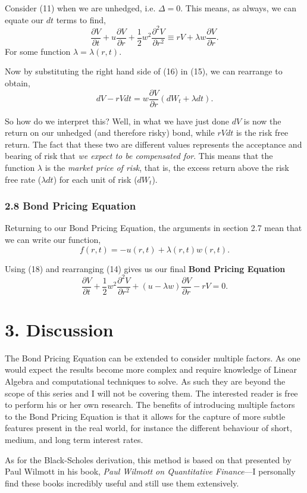 \documentclass[11pt]{article}
\begin{document}
Consider (11) when we are unhedged, i.e. $\Delta=0$. This means, as always, we can equate our $dt$ terms to find,
\begin{equation}
    \frac{\partial V}{\partial t} + u \frac{\partial V}{\partial r} + \frac{1}{2} w^2 \frac{\partial^2 V}{\partial r^2} \equiv rV + \lambda w \frac{\partial V}{\partial r}.
\end{equation}
For some function $\lambda = \lambda(r,t)$.

Now by substituting the right hand side of (16) in (15), we can rearrange to obtain, 
\begin{equation}
    dV - rVdt = w \frac{\partial V}{\partial r} (dW_t + \lambda dt). 
\end{equation}

So how do we interpret this? Well, in what we have just done $dV$ is now the return on our unhedged (and therefore risky) bond, while $rVdt$ is the risk free return. The fact that these two are different values represents the acceptance and bearing of risk that \textit{we expect to be compensated for}. This means that the function $\lambda$ is the \textit{market price of risk}, that is, the excess return above the risk free rate ($\lambda dt$) for each unit of risk ($dW_t$).

\subsubsection*{2.8 Bond Pricing Equation}
Returning to our Bond Pricing Equation, the arguments in section 2.7 mean that we can write our function,
\begin{equation}
    f(r,t) = -u(r,t) + \lambda(r,t) w(r,t).
\end{equation}

Using (18) and rearranging (14) gives us our final \textbf{Bond Pricing Equation}
\begin{equation}
    \frac{\partial V}{\partial t} + \frac{1}{2} w^2 \frac{\partial^2 V}{\partial r^2} + (u - \lambda w) \frac{\partial V}{\partial r} - rV = 0.
\end{equation}

\section*{3. Discussion}
The Bond Pricing Equation can be extended to consider multiple factors. As one would expect the results become more complex and require knowledge of Linear Algebra and computational techniques to solve. As such they are beyond the scope of this series and I will not be covering them. The interested reader is free to perform his or her own research. The benefits of introducing multiple factors to the Bond Pricing Equation is that it allows for the capture of more subtle features present in the real world, for instance the different behaviour of short, medium, and long term interest rates. 

As for the Black-Scholes derivation, this method is based on that presented by Paul Wilmott in his book, \textit{Paul Wilmott on Quantitative Finance}––I personally find these books incredibly useful and still use them extensively. 
\end{document}
